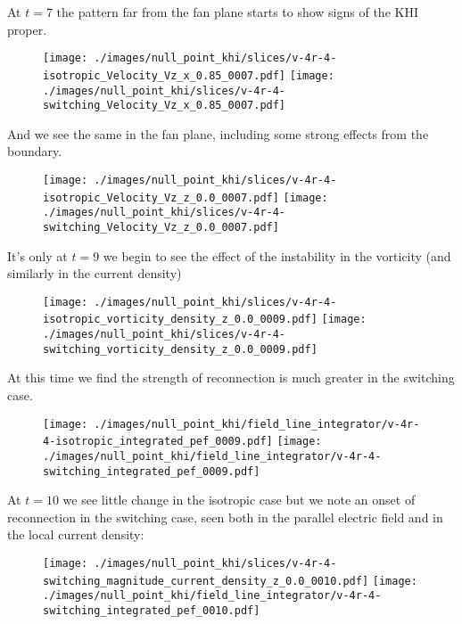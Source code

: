 At $t=7$ the pattern far from the fan plane starts to show signs of the KHI proper.

\begin{figure}[H]
  \centering
  \texttt{[image: ./images/null\_point\_khi/slices/v-4r-4-isotropic\_Velocity\_Vz\_x\_0.85\_0007.pdf]}
  \texttt{[image: ./images/null\_point\_khi/slices/v-4r-4-switching\_Velocity\_Vz\_x\_0.85\_0007.pdf]}
\end{figure}

And we see the same in the fan plane, including some strong effects from the boundary.

\begin{figure}[H]
  \centering
  \texttt{[image: ./images/null\_point\_khi/slices/v-4r-4-isotropic\_Velocity\_Vz\_z\_0.0\_0007.pdf]}
  \texttt{[image: ./images/null\_point\_khi/slices/v-4r-4-switching\_Velocity\_Vz\_z\_0.0\_0007.pdf]}
\end{figure}

It's only at $t=9$ we begin to see the effect of the instability in the vorticity (and similarly in the current density)

\begin{figure}[H]
  \centering
  \texttt{[image: ./images/null\_point\_khi/slices/v-4r-4-isotropic\_vorticity\_density\_z\_0.0\_0009.pdf]}
  \texttt{[image: ./images/null\_point\_khi/slices/v-4r-4-switching\_vorticity\_density\_z\_0.0\_0009.pdf]}
\end{figure}

At this time we find the strength of reconnection is much greater in the switching case.

\begin{figure}[H]
  \centering
  \texttt{[image: ./images/null\_point\_khi/field\_line\_integrator/v-4r-4-isotropic\_integrated\_pef\_0009.pdf]}
  \texttt{[image: ./images/null\_point\_khi/field\_line\_integrator/v-4r-4-switching\_integrated\_pef\_0009.pdf]}
\end{figure}

At $t=10$ we see little change in the isotropic case but we note an onset of reconnection in the switching case, seen both in the parallel electric field and in the local current density:

\begin{figure}[H]
  \centering
  \texttt{[image: ./images/null\_point\_khi/slices/v-4r-4-switching\_magnitude\_current\_density\_z\_0.0\_0010.pdf]}
  \texttt{[image: ./images/null\_point\_khi/field\_line\_integrator/v-4r-4-switching\_integrated\_pef\_0010.pdf]}
\end{figure}

